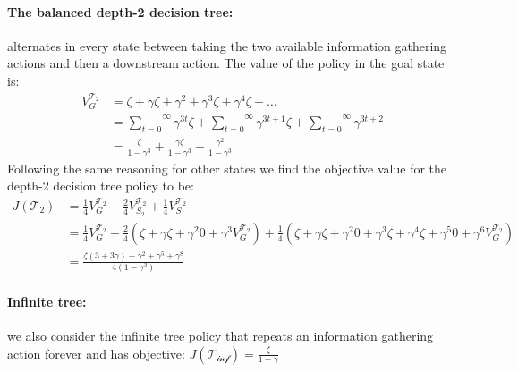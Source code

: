 \paragraph{The balanced depth-2 decision tree:}alternates in every state between taking the two available information gathering actions and then a downstream action.
The value of the policy in the goal state is:
\begin{align*}
    V^{\mathcal{T}_2}_{G} &= \zeta + \gamma\zeta + \gamma^2 + \gamma^3\zeta + \gamma^4\zeta + \dots \\
    &= \overset{\infty}{\underset{t=0}\sum} \gamma^{3t}\zeta + \overset{\infty}{\underset{t=0}\sum} \gamma^{3t+1}\zeta + \overset{\infty}{\underset{t=0}\sum} \gamma^{3t+2} \\
    &= \frac{\zeta}{1-\gamma^3} + \frac{\gamma\zeta}{1-\gamma^3} + \frac{\gamma^2}{1-\gamma^3}
\end{align*}
Following the same reasoning for other states we find the objective value for the depth-2 decision tree policy to be:
\begin{align*}
    J(\mathcal{T}_2) &=\frac{1}{4} V^{\mathcal{T}_2}_G + \frac{2}{4} V^{\mathcal{T}_2}_{S_2} + \frac{1}{4} V^{\mathcal{T}_2}_{S_1} \\
    &= \frac{1}{4} V^{\mathcal{T}_2}_G + \frac{2}{4}(\zeta + \gamma\zeta + \gamma^2 0 + \gamma^3V^{\mathcal{T}_2}_G) + \frac{1}{4} (\zeta+\gamma\zeta+\gamma^2 0 + \gamma^3\zeta+\gamma^4\zeta+\gamma^5 0 +\gamma^6 V^{\mathcal{T}_2}_G) \\
    &= \frac{\zeta(3+3\gamma)+\gamma^2+\gamma^5+\gamma^8}{4(1-\gamma^3)}
\end{align*}
\paragraph{Infinite tree:} we also consider the infinite tree policy that repeats an information gathering action forever and has objective: $J(\mathcal{T_{\text{inf}}}) = \frac{\zeta}{1-\gamma}$

